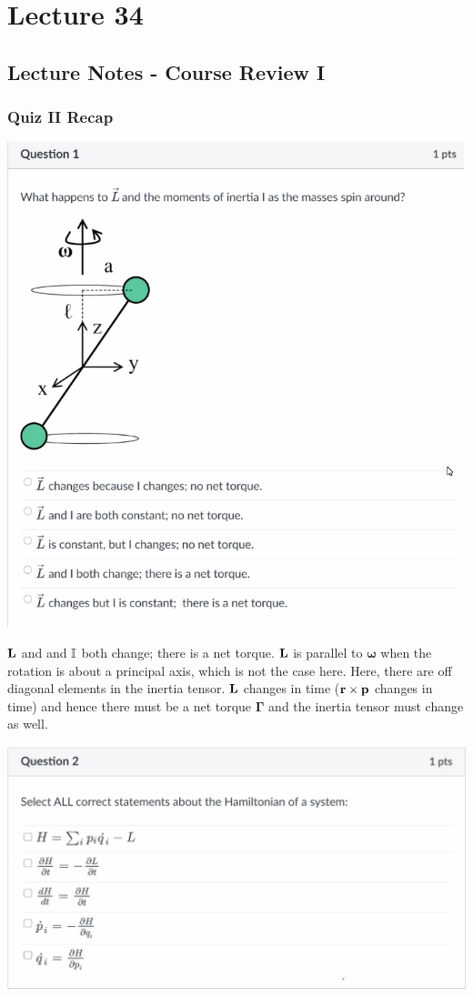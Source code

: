 \section{Lecture 34}
\subsection{Lecture Notes - Course Review I}
\subsubsection{Quiz II Recap}
\phantom{i}
\begin{center}
    \includegraphics[scale=0.7]{Lecture-34/l34-img1.png}
\end{center}
\begin{s}
$\mathbf{L}$ and and $\mathbb{I}$ both change; there is a net torque. $\mathbf{L}$ is parallel to $\bm{\omega}$ when the rotation is about a principal axis, which is not the case here. Here, there are off diagonal elements in the inertia tensor. $\mathbf{L}$ changes in time ($\mathbf{r} \times \mathbf{p}$ changes in time) and hence there must be a net torque $\bm{\Gamma}$ and the inertia tensor must change as well.
\end{s}
\begin{center}
    \includegraphics[scale=0.7]{Lecture-34/l34-img2.png}
\end{center}
